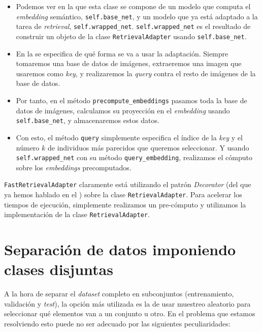\begin{itemize}
	\item Podemos ver en la  que esta clase se compone de un modelo que computa el \textit{embedding} semántico, \lstinline{self.base_net}, y un modelo que ya está adaptado a la tarea de \textit{retrieval}, \lstinline{self.wrapped_net}. \lstinline{self.wrapped_net} es el resultado de construir un objeto de la clase \lstinline{RetrievalAdapter} usando \lstinline{self.base_net}.
	\item En la  se especifica de qué forma se va a usar la adaptación. Siempre tomaremos una base de datos de imágenes, extraeremos una imagen que usaremos como \textit{key}, y realizaremos la \textit{query} contra el resto de imágenes de la base de datos.
	\item Por tanto, en el método \lstinline{precompute_embeddings} pasamos toda la base de datos de imágenes, calculamos su proyección en el \textit{embedding} usando \lstinline{self.base_net}, y almacenaremos estos datos.
	\item Con esto, el método \lstinline{query} simplemente especifica el índice de la \textit{key} y el número $k$ de individuos más parecidos que queremos seleccionar. Y usando \lstinline{self.wrapped_net} con su método \lstinline{query_embedding}, realizamos el cómputo sobre los \textit{embeddings} precomputados.
\end{itemize}

\begin{sloppypar}
	\lstinline{FastRetrievalAdapter} claramente está utilizando el patrón \textit{Decorator} (del que ya hemos hablado en el ) sobre la clase \lstinline{RetrievalAdapter}. Para acelerar los tiempos de ejecución, simplemente realizamos un pre-cómputo y utilizamos la implementación de la clase \lstinline{RetrievalAdapter}.
\end{sloppypar}

\section{Separación de datos imponiendo clases disjuntas}

A la hora de separar el \textit{dataset} completo en subconjuntos (entrenamiento, validación y \textit{test}), la opción más utilizada es la de usar muestreo aleatorio para seleccionar qué elementos van a un conjunto u otro. En el problema que estamos resolviendo esto puede no ser adecuado por las siguientes peculiaridades:

